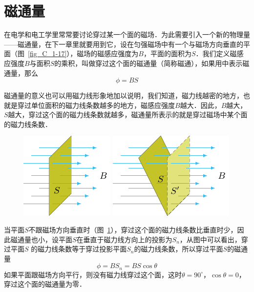 \section{磁通量}
在电学和电工学里常常要讨论穿过某一个面的磁场．为此需要引入一个新的物理量——磁通量，在下一章里就要用到它，设在匀强磁场中有一个与磁场方向垂直的平面（图~\ref{fig_C_1-17}），磁场的磁感应强度为$B$，平面的面积为$S$．我们定义磁感应强度$B$与面积$S$的乘积，叫做穿过这个面的磁通量（简称磁通），如果用中表示磁通量，那么
\[\phi=BS \]

磁通量的意义也可以用磁力线形象地加以说明，我们知道，磁力线越密的地方，也就是穿过单位面积的磁力线条数越多的地方，磁感应强度$B$越大．因此，$B$越大，$S$越大，穿过这个面的磁力线条数就越多，磁通量所表示的就是穿过磁场中某个面的磁力线条数．

\begin{figure}[htbp]
    \centering
    \begin{minipage}[t]{0.48\textwidth}
        \centering
        \includegraphics{fig/C/1-17.pdf}
        \caption{}\label{fig_C_1-17}
    \end{minipage}
    \begin{minipage}[t]{0.48\textwidth}
        \centering
        \includegraphics{fig/C/1-18.pdf}
        \caption{}\label{fig_C_1-18}
    \end{minipage}
\end{figure}


当平面$S$不跟磁场方向垂直时（图~\ref{fig_C_1-18}），穿过这个面的磁力线条数比垂直时少，因此磁通量也小，设平面$S$在垂直于磁力线方向上的投影为$S_n$，从图中可以看出，穿过平面$S$
的磁力线条数等于穿过投影平面$S_n$的磁力线条数，所以穿过平面$S$的磁通量
\[\phi=BS_n=BS\cos\theta\]
如果平面跟磁场方向平行，则没有磁力线穿过这个面，这时$\theta=90^\circ$，$\cos\theta=0$，穿过这个面的磁通量为零．

